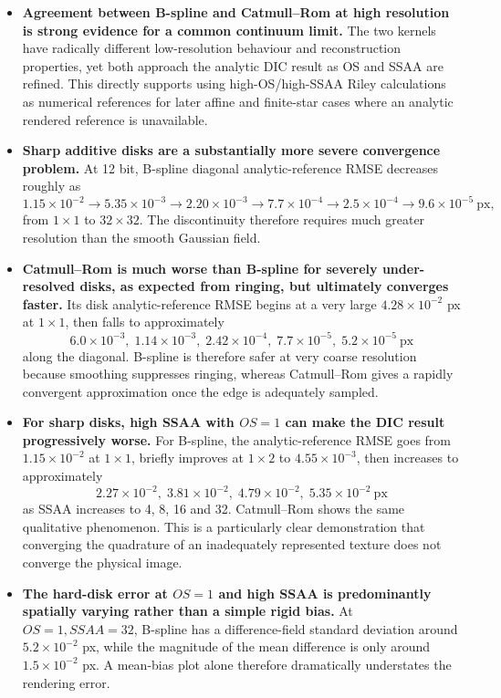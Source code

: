 \documentclass[11pt,a4paper]{article}
\begin{document}
\begin{itemize}
\item \textbf{Agreement between B-spline and Catmull--Rom at high resolution is strong evidence for a common continuum limit.}
The two kernels have radically different low-resolution behaviour and reconstruction properties, yet both approach the analytic DIC result as OS and SSAA are refined. This directly supports using high-OS/high-SSAA Riley calculations as numerical references for later affine and finite-star cases where an analytic rendered reference is unavailable.

\item \textbf{Sharp additive disks are a substantially more severe convergence problem.}
At 12 bit, B-spline diagonal analytic-reference RMSE decreases roughly as
\[
1.15\times10^{-2}
\rightarrow 5.35\times10^{-3}
\rightarrow 2.20\times10^{-3}
\rightarrow 7.7\times10^{-4}
\rightarrow 2.5\times10^{-4}
\rightarrow 9.6\times10^{-5}\ \mathrm{px},
\]
from $1\times1$ to $32\times32$. The discontinuity therefore requires much greater resolution than the smooth Gaussian field.

\item \textbf{Catmull--Rom is much worse than B-spline for severely under-resolved disks, as expected from ringing, but ultimately converges faster.}
Its disk analytic-reference RMSE begins at a very large $4.28\times10^{-2}$ px at $1\times1$, then falls to approximately
\[
6.0\times10^{-3},\;
1.14\times10^{-3},\;
2.42\times10^{-4},\;
7.7\times10^{-5},\;
5.2\times10^{-5}\ \mathrm{px}
\]
along the diagonal. B-spline is therefore safer at very coarse resolution because smoothing suppresses ringing, whereas Catmull--Rom gives a rapidly convergent approximation once the edge is adequately sampled.

\item \textbf{For sharp disks, high SSAA with $OS=1$ can make the DIC result progressively worse.}
For B-spline, the analytic-reference RMSE goes from $1.15\times10^{-2}$ at $1\times1$, briefly improves at $1\times2$ to $4.55\times10^{-3}$, then increases to approximately
\[
2.27\times10^{-2},\;
3.81\times10^{-2},\;
4.79\times10^{-2},\;
5.35\times10^{-2}\ \mathrm{px}
\]
as SSAA increases to 4, 8, 16 and 32. Catmull--Rom shows the same qualitative phenomenon. This is a particularly clear demonstration that converging the quadrature of an inadequately represented texture does not converge the physical image.

\item \textbf{The hard-disk error at $OS=1$ and high SSAA is predominantly spatially varying rather than a simple rigid bias.}
At $OS=1,SSAA=32$, B-spline has a difference-field standard deviation around $5.2\times10^{-2}$ px, while the magnitude of the mean difference is only around $1.5\times10^{-2}$ px. A mean-bias plot alone therefore dramatically understates the rendering error.


\end{itemize}
\end{document}
